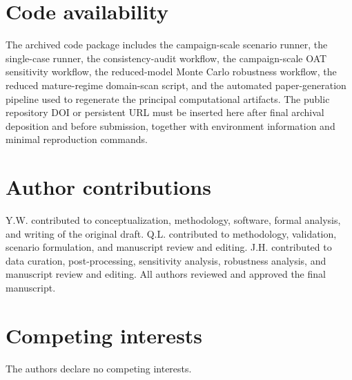 \documentclass[12pt]{article}
\begin{document}
\section*{Code availability}
The archived code package includes the campaign-scale scenario runner, the single-case runner, the consistency-audit workflow, the campaign-scale OAT sensitivity workflow, the reduced-model Monte Carlo robustness workflow, the reduced mature-regime domain-scan script, and the automated paper-generation pipeline used to regenerate the principal computational artifacts. The public repository DOI or persistent URL must be inserted here after final archival deposition and before submission, together with environment information and minimal reproduction commands.

\section*{Author contributions}
Y.W. contributed to conceptualization, methodology, software, formal analysis, and writing of the original draft. Q.L. contributed to methodology, validation, scenario formulation, and manuscript review and editing. J.H. contributed to data curation, post-processing, sensitivity analysis, robustness analysis, and manuscript review and editing. All authors reviewed and approved the final manuscript.

\section*{Competing interests}
The authors declare no competing interests.
\end{document}

